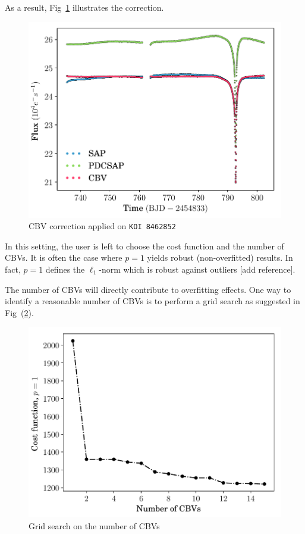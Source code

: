 \documentclass{article}
\begin{document}
As a result, Fig~\ref{fig:cbv-correction} illustrates the correction.
\begin{figure}[!htb]
    \centering
    \includegraphics[scale=.5]{figs/cbv.pdf}
    \caption{CBV correction applied on \texttt{KOI 8462852}}
    \label{fig:cbv-correction}
\end{figure}

In this setting, the user is left to choose the cost function and the number
of CBVs. It is often the case where $p=1$ yields robust (non-overfitted) results.
In fact, $p=1$ defines the $\ell_1$-norm which is robust against outliers [add reference].

The number of CBVs will directly contribute to overfitting effects. One
way to identify a reasonable number of CBVs is to perform a grid search
as suggested in Fig~(\ref{fig:cbv-grid-search}).

\begin{figure}[!htb]
    \centering
    \includegraphics[scale=.5]{figs/cbv-grid-search.pdf}
    \caption{Grid search on the number of CBVs}
    \label{fig:cbv-grid-search}
\end{figure}
\end{document}
